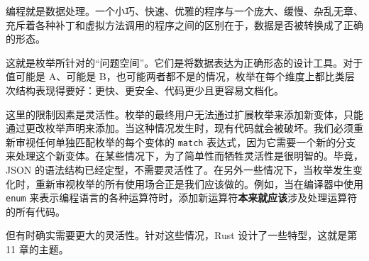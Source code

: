 编程就是数据处理。一个小巧、快速、优雅的程序与一个庞大、缓慢、杂乱无章、充斥着各种补丁和虚拟方法调用的程序之间的区别在于，数据是否被转换成了正确的形态。

这就是枚举所针对的“问题空间”。它们是将数据表达为正确形态的设计工具。对于值可能是 A、可能是 B，也可能两者都不是的情况，枚举在每个维度上都比类层次结构表现得要好：更快、更安全、代码更少且更容易文档化。

这里的限制因素是灵活性。枚举的最终用户无法通过扩展枚举来添加新变体，只能通过更改枚举声明来添加。当这种情况发生时，现有代码就会被破坏。我们必须重新审视任何单独匹配枚举的每个变体的 \texttt{match} 表达式，因为它需要一个新的分支来处理这个新变体。在某些情况下，为了简单性而牺牲灵活性是很明智的。毕竟，JSON 的语法结构已经定型，不需要灵活性了。在另外一些情况下，当枚举发生变化时，重新审视枚举的所有使用场合正是我们应该做的。例如，当在编译器中使用 \texttt{enum} 来表示编程语言的各种运算符时，添加新运算符\textbf{本来就应该}涉及处理运算符的所有代码。

但有时确实需要更大的灵活性。针对这些情况，Rust 设计了一些特型，这就是第 11 章的主题。

